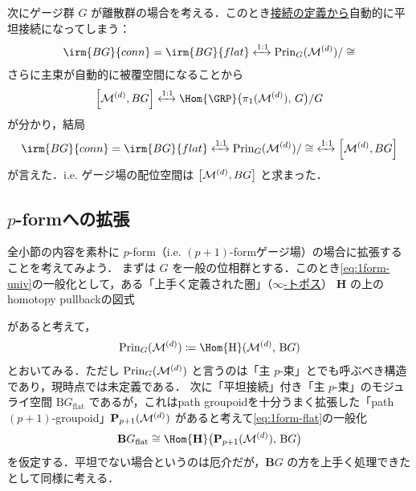 \documentclass[TQFT_main]{subfiles}
\begin{document}
次にゲージ群 $G$ が離散群の場合を考える．このとき\underline{接続の定義から}自動的に平坦接続になってしまう：
\begin{align}
    \label{eq:1form-finite-flat}
    \irm{BG}{conn} = \irm{BG}{flat} \xleftrightarrow{1:1} \mathrm{Prin}_G (\mfdcal{M}{d})/\cong
\end{align}
さらに主束が自動的に被覆空間になることから
\begin{align}
    \comm{\mfdcal{M}{d}}{BG} \xleftrightarrow{1:1} \Hom{\GRP} \bigl( \pi_1(\mfdcal{M}{d}),\, G \bigr) /G
\end{align}
が分かり，結局
\begin{align}
    \label{eq:1form-moduli}
    \irm{BG}{conn} = \irm{BG}{flat} \xleftrightarrow{1:1} \mathrm{Prin}_G (\mfdcal{M}{d})/\cong\; \xleftrightarrow{1:1} \comm{\mfdcal{M}{d}}{BG}
\end{align}
が言えた．i.e. ゲージ場の配位空間は $\comm{\mfdcal{M}{d}}{BG}$ と求まった．

\subsection{$p$-formへの拡張}

全小節の内容を素朴に $p$-form（i.e. $(p+1)$-formゲージ場）の場合に拡張することを考えてみよう．
まずは $G$ を一般の位相群とする．このとき\eqref{eq:1form-univ}の一般化として，ある「上手く定義された圏」（\hyperref[def:infinity-topos]{$\infty$-トポス}） $\mathrm{\bm{H}}$ の上のhomotopy pullbackの図式
\begin{center}
\end{center}
があると考えて，
\begin{align}
    \mathrm{Prin}_G (\mfdcal{M}{d}) \coloneqq \Hom{\mathrm{\bm{H}}} (\mfdcal{M}{d},\, \mathrm{\bm{B}}G)
\end{align}
とおいてみる．ただし $\mathrm{Prin}_G (\mathcal{M}^{(d)})$ と言うのは「主 $p$-束」とでも呼ぶべき構造であり，現時点では未定義である．
次に「平坦接続」付き「主 $p$-束」のモジュライ空間 $\bm{\mathrm{B}}G_{\mathrm{flat}}$ であるが，これはpath groupoidを十分うまく拡張した「path $(p+1)$-groupoid」$\bm{\mathrm{P}}_{p+1}(\mathcal{M}^{(d)})$ があると考えて\eqref{eq:1form-flat}の一般化
\begin{align}
    \bm{\mathrm{B}}G_{\mathrm{flat}} \cong \Hom{\bm{\mathrm{H}}} \bigl( \bm{\mathrm{P}}_{p+1}(\mfdcal{M}{d}),\, \mathrm{\bm{B}}G\bigr) 
\end{align}
を仮定する．平坦でない場合というのは厄介だが，$\mathrm{\bm{B}}G$ の方を上手く処理できたとして同様に考える．
\end{document}
